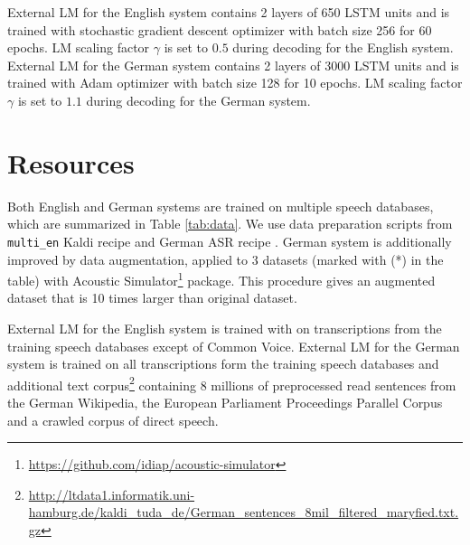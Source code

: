 \documentclass[12pt,a4paper]{article}
\begin{document}
External LM for the English system contains 2 layers of 650 LSTM units
and is trained with stochastic gradient descent optimizer with
batch size 256 for 60 epochs.
LM scaling factor $\gamma$ is set to $0.5$
during decoding for the English system.
External LM for the German system contains 2 layers of 3000 LSTM units
and is trained with Adam optimizer \cite{kingma2014adam} with
batch size 128 for 10 epochs.
LM scaling factor $\gamma$ is set to $1.1$
during decoding for the German system.

\section{Resources}
Both English and German systems
are trained on multiple speech databases, which are summarized in
Table \ref{tab:data}.
We use data preparation scripts from \texttt{multi\_en} Kaldi recipe
and German ASR recipe \cite{milde-koehn-18-german-asr}.
German system is additionally improved by data augmentation,
applied to 3 datasets (marked with (*) in the table)
with Acoustic Simulator\footnote{\url{https://github.com/idiap/acoustic-simulator}} package.
This procedure gives an augmented dataset that is 10 times larger than original dataset.

External LM for the English system is trained with on transcriptions from the training speech databases
except of Common Voice. External LM for the German system is trained on all transcriptions
form the training speech databases and additional text
corpus\footnote{\url{http://ltdata1.informatik.uni-hamburg.de/kaldi_tuda_de/German_sentences_8mil_filtered_maryfied.txt.gz}}
containing 8 millions of preprocessed read sentences
from the German Wikipedia, the European Parliament Proceedings Parallel Corpus and a crawled corpus of direct speech.
\end{document}

